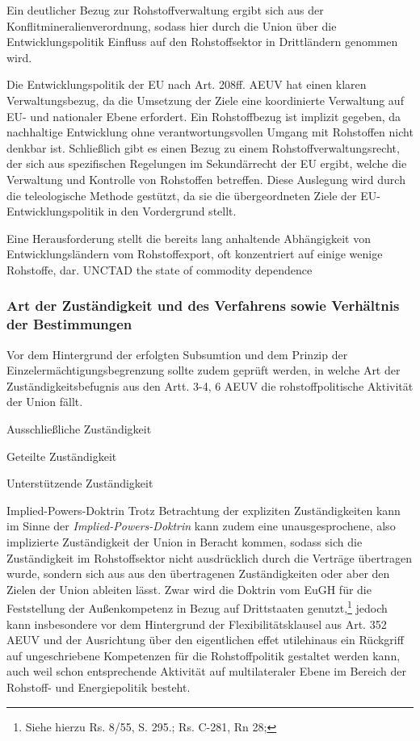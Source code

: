 \documentclass[12pt,a4paper,oneside]{book} %
\begin{document}
Ein deutlicher Bezug zur Rohstoffverwaltung ergibt sich aus der Konflitmineralienverordnung, sodass hier durch die Union über die Entwicklungspolitik Einfluss auf den Rohstoffsektor in Drittländern genommen wird.\autocite{Schorkopf, Rohstoffverwaltung, Rn. 53}
	
Die Entwicklungspolitik der EU nach Art. 208ff. AEUV hat einen klaren Verwaltungsbezug, da die Umsetzung der Ziele eine koordinierte Verwaltung auf EU- und nationaler Ebene erfordert. Ein Rohstoffbezug ist implizit gegeben, da nachhaltige Entwicklung ohne verantwortungsvollen Umgang mit Rohstoffen nicht denkbar ist. Schließlich gibt es einen Bezug zu einem Rohstoffverwaltungsrecht, der sich aus spezifischen Regelungen im Sekundärrecht der EU ergibt, welche die Verwaltung und Kontrolle von Rohstoffen betreffen. Diese Auslegung wird durch die teleologische Methode gestützt, da sie die übergeordneten Ziele der EU-Entwicklungspolitik in den Vordergrund stellt.

Eine Herausforderung stellt die bereits lang anhaltende Abhängigkeit von Entwicklungsländern vom Rohstoffexport, oft konzentriert auf einige wenige Rohstoffe, dar.\autocite{Haglund, D.: Blessing or Course. The rise of mineral dependence, Oxford Policy Management 2011}
UNCTAD the state of commodity dependence
	
\subsubsection{Art der Zuständigkeit und des Verfahrens sowie Verhältnis der Bestimmungen}

Vor dem Hintergrund der erfolgten Subsumtion und dem Prinzip der Einzelermächtigungsbegrenzung sollte zudem geprüft werden, in welche Art der Zuständigkeitsbefugnis aus den Artt. 3-4, 6 AEUV die rohstoffpolitische Aktivität der Union fällt.
	
Ausschließliche Zuständigkeit
	
Geteilte Zuständigkeit
	
Unterstützende Zuständigkeit
	
Implied-Powers-Doktrin
Trotz Betrachtung der expliziten Zuständigkeiten kann im Sinne der \textit{Implied-Powers-Doktrin} kann zudem eine unausgesprochene, also implizierte Zuständigkeit der Union in Beracht kommen, sodass sich die Zuständigkeit im Rohstoffsektor nicht ausdrücklich durch die Verträge übertragen wurde, sondern sich aus aus den übertragenen Zuständigkeiten oder aber den Zielen der Union ableiten lässt. Zwar wird die Doktrin vom EuGH für die Feststellung der Außenkompetenz in Bezug auf Drittstaaten genutzt,\footnote{Siehe hierzu Rs. 8/55, S. 295.; Rs. C-281, Rn 28; } jedoch kann insbesondere vor dem Hintergrund der Flexibilitätsklausel aus Art. 352 AEUV und der Ausrichtung über den eigentlichen \glqq effet utile\glqq hinaus\autocite{Callies/Ruffert, Art. 352 AEUV., Rn. 67} ein Rückgriff auf ungeschriebene Kompetenzen für die Rohstoffpolitik gestaltet werden kann, auch weil schon entsprechende Aktivität auf multilateraler Ebene im Bereich der Rohstoff- und Energiepolitik besteht.\autocites{EU 6 - 3000 - 025/24, S. 8}{Bungenberg, in: Pechstein/Nowak/Häde, Frankfurter Kommentar EUV/GRC/AEUV, 2. Auflage 2023, AEUV, Art. 207, Rn. 223.}
	
\end{document}
